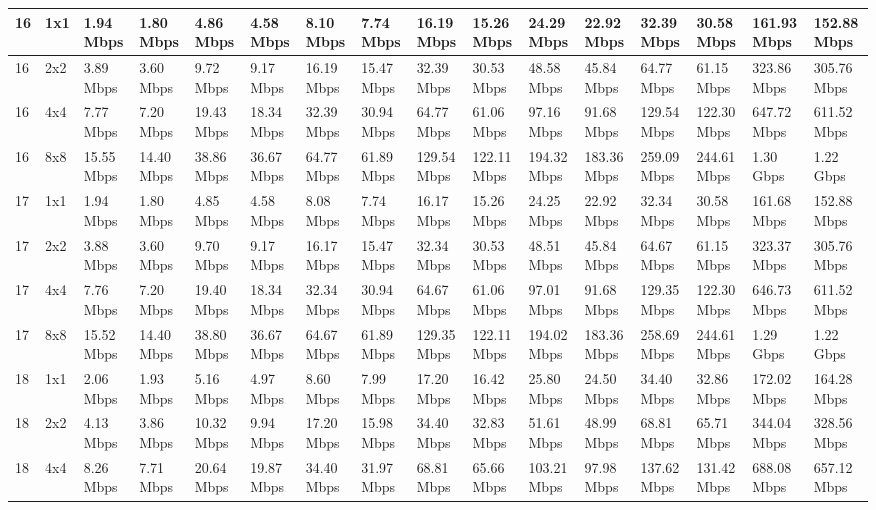 \documentclass[12pt]{article}
\begin{document}
\begin{longtable}[c]{|l|l|l|l|l|l|l|l|l|l|l|l|l|l|l|l|}
16 & 1x1 & 1.94 Mbps & 1.80 Mbps & 4.86 Mbps & 4.58 Mbps & 8.10 Mbps & 7.74 Mbps & 16.19 Mbps & 15.26 Mbps & 24.29 Mbps & 22.92 Mbps & 32.39 Mbps & 30.58 Mbps & 161.93 Mbps & 152.88 Mbps \\ \hline
16 & 2x2 & 3.89 Mbps & 3.60 Mbps & 9.72 Mbps & 9.17 Mbps & 16.19 Mbps & 15.47 Mbps & 32.39 Mbps & 30.53 Mbps & 48.58 Mbps & 45.84 Mbps & 64.77 Mbps & 61.15 Mbps & 323.86 Mbps & 305.76 Mbps \\ \hline
16 & 4x4 & 7.77 Mbps & 7.20 Mbps & 19.43 Mbps & 18.34 Mbps & 32.39 Mbps & 30.94 Mbps & 64.77 Mbps & 61.06 Mbps & 97.16 Mbps & 91.68 Mbps & 129.54 Mbps & 122.30 Mbps & 647.72 Mbps & 611.52 Mbps \\ \hline
16 & 8x8 & 15.55 Mbps & 14.40 Mbps & 38.86 Mbps & 36.67 Mbps & 64.77 Mbps & 61.89 Mbps & 129.54 Mbps & 122.11 Mbps & 194.32 Mbps & 183.36 Mbps & 259.09 Mbps & 244.61 Mbps & 1.30 Gbps & 1.22 Gbps \\ \hline
17 & 1x1 & 1.94 Mbps & 1.80 Mbps & 4.85 Mbps & 4.58 Mbps & 8.08 Mbps & 7.74 Mbps & 16.17 Mbps & 15.26 Mbps & 24.25 Mbps & 22.92 Mbps & 32.34 Mbps & 30.58 Mbps & 161.68 Mbps & 152.88 Mbps \\ \hline
17 & 2x2 & 3.88 Mbps & 3.60 Mbps & 9.70 Mbps & 9.17 Mbps & 16.17 Mbps & 15.47 Mbps & 32.34 Mbps & 30.53 Mbps & 48.51 Mbps & 45.84 Mbps & 64.67 Mbps & 61.15 Mbps & 323.37 Mbps & 305.76 Mbps \\ \hline
17 & 4x4 & 7.76 Mbps & 7.20 Mbps & 19.40 Mbps & 18.34 Mbps & 32.34 Mbps & 30.94 Mbps & 64.67 Mbps & 61.06 Mbps & 97.01 Mbps & 91.68 Mbps & 129.35 Mbps & 122.30 Mbps & 646.73 Mbps & 611.52 Mbps \\ \hline
17 & 8x8 & 15.52 Mbps & 14.40 Mbps & 38.80 Mbps & 36.67 Mbps & 64.67 Mbps & 61.89 Mbps & 129.35 Mbps & 122.11 Mbps & 194.02 Mbps & 183.36 Mbps & 258.69 Mbps & 244.61 Mbps & 1.29 Gbps & 1.22 Gbps \\ \hline
18 & 1x1 & 2.06 Mbps & 1.93 Mbps & 5.16 Mbps & 4.97 Mbps & 8.60 Mbps & 7.99 Mbps & 17.20 Mbps & 16.42 Mbps & 25.80 Mbps & 24.50 Mbps & 34.40 Mbps & 32.86 Mbps & 172.02 Mbps & 164.28 Mbps \\ \hline
18 & 2x2 & 4.13 Mbps & 3.86 Mbps & 10.32 Mbps & 9.94 Mbps & 17.20 Mbps & 15.98 Mbps & 34.40 Mbps & 32.83 Mbps & 51.61 Mbps & 48.99 Mbps & 68.81 Mbps & 65.71 Mbps & 344.04 Mbps & 328.56 Mbps \\ \hline
18 & 4x4 & 8.26 Mbps & 7.71 Mbps & 20.64 Mbps & 19.87 Mbps & 34.40 Mbps & 31.97 Mbps & 68.81 Mbps & 65.66 Mbps & 103.21 Mbps & 97.98 Mbps & 137.62 Mbps & 131.42 Mbps & 688.08 Mbps & 657.12 Mbps \\ \hline

\end{longtable}
\end{document}
